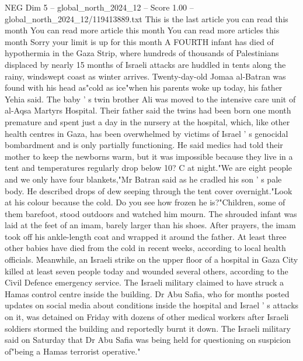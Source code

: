\begin{textsample}{NEG Dim 5 – global\_north\_2024\_12 – Score 1.00 – global\_north\_2024\_12/119413889.txt}  \label{ex:f5_neg_355}
This is the last article you can read this month You can read more article this month You can read more articles this month Sorry your limit is up for this month A FOURTH infant has died of hypothermia in the Gaza Strip, where hundreds of thousands of Palestinians displaced by nearly 15 months of Israeli attacks are huddled in tents along the rainy, windswept coast as winter arrives.
Twenty-day-old Jomaa al-Batran was found with his head as"cold as ice"when his parents woke up today, his father Yehia said.
The baby ' s twin brother Ali was moved to the intensive care unit of al-Aqsa Martyrs Hospital.
Their father said the twins had been born one month premature and spent just a day in the nursery at the hospital, which, like other health centres in Gaza, has been overwhelmed by victims of Israel ' s genocidal bombardment and is only partially functioning.
He said medics had told their mother to keep the newborns warm, but it was impossible because they live in a tent and temperatures regularly drop below 10?
C at night."We are eight people and we only have four blankets,"Mr Batran said as he cradled his son ' s pale body.
He described drops of dew seeping through the tent cover overnight."Look at his colour because the cold.
Do you see how frozen he is?"Children, some of them barefoot, stood outdoors and watched him mourn.
The shrouded infant was laid at the feet of an imam, barely larger than his shoes.
After prayers, the imam took off his ankle-length coat and wrapped it around the father.
At least three other babies have died from the cold in recent weeks, according to local health officials.
Meanwhile, an Israeli strike on the upper floor of a hospital in Gaza City killed at least seven people today and wounded several others, according to the Civil Defence emergency service.
The Israeli military claimed to have struck a Hamas control centre inside the building.
Dr Abu Safia, who for months posted updates on social media about conditions inside the hospital and Israel ' s attacks on it, was detained on Friday with dozens of other medical workers after Israeli soldiers stormed the building and reportedly burnt it down.
The Israeli military said on Saturday that Dr Abu Safia was being held for questioning on suspicion of"being a Hamas terrorist operative."

\end{textsample}
